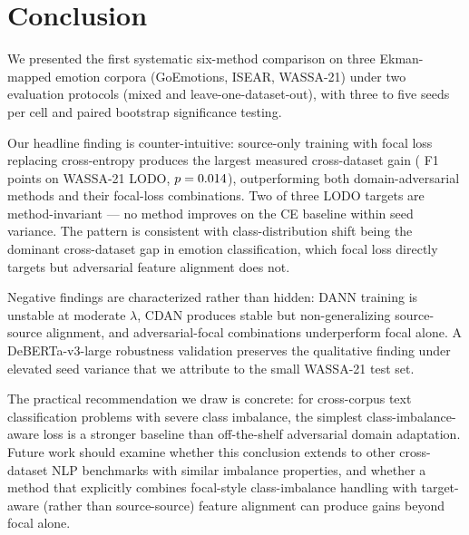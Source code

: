 \section{Conclusion}
\label{sec:conclusion}

We presented the first systematic six-method comparison on three
Ekman-mapped emotion corpora (GoEmotions, ISEAR, WASSA-21) under two
evaluation protocols (mixed and leave-one-dataset-out), with three to
five seeds per cell and paired bootstrap significance testing.

Our headline finding is counter-intuitive: source-only training with
focal loss replacing cross-entropy produces the largest measured
cross-dataset gain (\focalwassagain{} F1 points on WASSA-21 LODO,
$p = 0.014$), outperforming both domain-adversarial methods
and their focal-loss combinations. Two of three LODO targets are
method-invariant — no method improves on the CE baseline within seed
variance. The pattern is consistent with class-distribution shift
being the dominant cross-dataset gap in emotion classification, which
focal loss directly targets but adversarial feature alignment does not.

Negative findings are characterized rather than hidden: DANN training
is unstable at moderate $\lambda$, CDAN produces stable but
non-generalizing source-source alignment, and adversarial-focal
combinations underperform focal alone. A DeBERTa-v3-large robustness
validation preserves the qualitative finding under elevated seed
variance that we attribute to the small WASSA-21 test set.

The practical recommendation we draw is concrete: for cross-corpus
text classification problems with severe class imbalance, the simplest
class-imbalance-aware loss is a stronger baseline than off-the-shelf
adversarial domain adaptation. Future work should examine whether
this conclusion extends to other cross-dataset NLP benchmarks with
similar imbalance properties, and whether a method that explicitly
combines focal-style class-imbalance handling with target-aware
(rather than source-source) feature alignment can produce gains
beyond focal alone.
